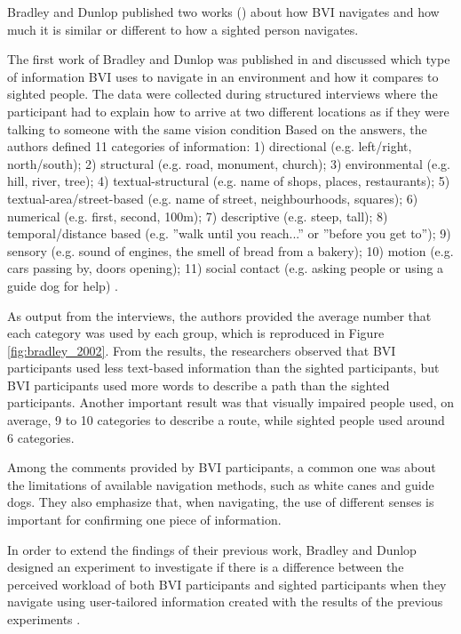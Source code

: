 Bradley and Dunlop published two works (\citeyear{bradley2002investigating,bradley2005experimental}) about how BVI navigates and how much it is similar or different to how a sighted person navigates. 

The first work of Bradley and Dunlop was published in \citeyear{bradley2002investigating} and discussed which type of information BVI uses to navigate in an environment and how it compares to sighted people. The data were collected during structured interviews where the participant had to explain how to arrive at two different locations as if they were talking to someone with the same vision condition \cite{bradley2002investigating}
\citeyear{}
Based on the answers, the authors defined 11 categories of information: 1) directional (e.g. left/right, north/south); 2) structural (e.g. road, monument, church); 3) environmental (e.g. hill, river, tree); 4) textual-structural (e.g. name of shops, places, restaurants); 5) textual-area/street-based (e.g. name of street, neighbourhoods, squares); 6) numerical (e.g. first, second, 100m); 7) descriptive (e.g. steep, tall); 8) temporal/distance based (e.g. ”walk until you reach...” or ”before you get to”); 9) sensory (e.g. sound of engines, the smell of bread from a bakery); 10) motion (e.g. cars passing by, doors opening); 11) social contact (e.g. asking people or using a guide dog for help) \cite{bradley2002investigating}.

As output from the interviews, the authors provided the average number that each category was used by each group, which is reproduced in Figure \ref{fig:bradley_2002}. From the results, the researchers observed that BVI participants used less text-based information than the sighted participants, but BVI participants used more words to describe a path than the sighted participants. Another important result was that visually impaired people used, on average, 9 to 10 categories to describe a route, while sighted people used around 6 categories.



Among the comments provided by BVI participants, a common one was about the limitations of available navigation methods, such as white canes and guide dogs. They also emphasize that, when navigating, the use of different senses is important for confirming one piece of information. 

In order to extend the findings of their previous work, Bradley and Dunlop designed an experiment to investigate if there is a difference between the perceived workload of both BVI participants and sighted participants when they navigate using user-tailored information created with the results of the previous experiments \cite{bradley2005experimental}.

